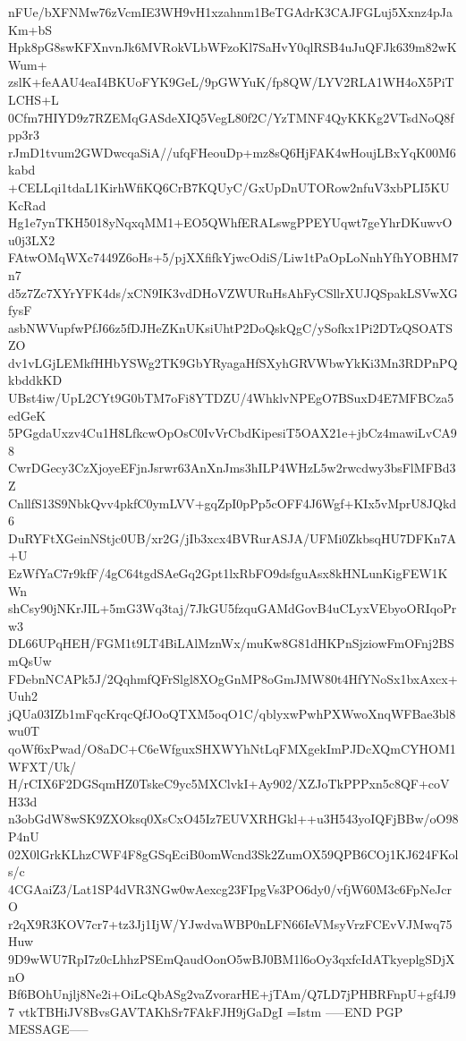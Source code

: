 nFUe/bXFNMw76zVcmIE3WH9vH1xzahnm1BeTGAdrK3CAJFGLuj5Xxnz4pJaKm+bS
Hpk8pG8swKFXnvnJk6MVRokVLbWFzoKl7SaHvY0qlRSB4uJuQFJk639m82wKWum+
zslK+feAAU4eaI4BKUoFYK9GeL/9pGWYuK/fp8QW/LYV2RLA1WH4oX5PiTLCHS+L
0Cfm7HIYD9z7RZEMqGASdeXIQ5VegL80f2C/YzTMNF4QyKKKg2VTsdNoQ8fpp3r3
rJmD1tvum2GWDwcqaSiA//ufqFHeouDp+mz8sQ6HjFAK4wHoujLBxYqK00M6kabd
+CELLqi1tdaL1KirhWfiKQ6CrB7KQUyC/GxUpDnUTORow2nfuV3xbPLI5KUKcRad
Hg1e7ynTKH5018yNqxqMM1+EO5QWhfERALswgPPEYUqwt7geYhrDKuwvOu0j3LX2
FAtwOMqWXc7449Z6oHs+5/pjXXfifkYjwcOdiS/Liw1tPaOpLoNnhYfhYOBHM7n7
d5z7Zc7XYrYFK4ds/xCN9IK3vdDHoVZWURuHsAhFyCSllrXUJQSpakLSVwXGfysF
asbNWVupfwPfJ66z5fDJHeZKnUKsiUhtP2DoQskQgC/ySofkx1Pi2DTzQSOATSZO
dv1vLGjLEMkfHHbYSWg2TK9GbYRyagaHfSXyhGRVWbwYkKi3Mn3RDPnPQkbddkKD
UBst4iw/UpL2CYt9G0bTM7oFi8YTDZU/4WhklvNPEgO7BSuxD4E7MFBCza5edGeK
5PGgdaUxzv4Cu1H8LfkcwOpOsC0IvVrCbdKipesiT5OAX21e+jbCz4mawiLvCA98
CwrDGecy3CzXjoyeEFjnJsrwr63AnXnJms3hILP4WHzL5w2rwcdwy3bsFlMFBd3Z
CnllfS13S9NbkQvv4pkfC0ymLVV+gqZpI0pPp5cOFF4J6Wgf+KIx5vMprU8JQkd6
DuRYFtXGeinNStjc0UB/xr2G/jIb3xcx4BVRurASJA/UFMi0ZkbsqHU7DFKn7A+U
EzWfYaC7r9kfF/4gC64tgdSAeGq2Gpt1lxRbFO9dsfguAsx8kHNLunKigFEW1KWn
shCsy90jNKrJIL+5mG3Wq3taj/7JkGU5fzquGAMdGovB4uCLyxVEbyoORIqoPrw3
DL66UPqHEH/FGM1t9LT4BiLAlMznWx/muKw8G81dHKPnSjziowFmOFnj2BSmQsUw
FDebnNCAPk5J/2QqhmfQFrSlgl8XOgGnMP8oGmJMW80t4HfYNoSx1bxAxcx+Uuh2
jQUa03IZb1mFqcKrqcQfJOoQTXM5oqO1C/qblyxwPwhPXWwoXnqWFBae3bl8wu0T
qoWf6xPwad/O8aDC+C6eWfguxSHXWYhNtLqFMXgekImPJDcXQmCYHOM1WFXT/Uk/
H/rCIX6F2DGSqmHZ0TskeC9yc5MXClvkI+Ay902/XZJoTkPPPxn5c8QF+coVH33d
n3obGdW8wSK9ZXOksq0XsCxO45Iz7EUVXRHGkl++u3H543yoIQFjBBw/oO98P4nU
02X0lGrkKLhzCWF4F8gGSqEciB0omWcnd3Sk2ZumOX59QPB6COj1KJ624FKols/c
4CGAaiZ3/Lat1SP4dVR3NGw0wAexcg23FIpgVs3PO6dy0/vfjW60M3c6FpNeJcrO
r2qX9R3KOV7cr7+tz3Jj1IjW/YJwdvaWBP0nLFN66IeVMsyVrzFCEvVJMwq75Huw
9D9wWU7RpI7z0cLhhzPSEmQaudOonO5wBJ0BM1l6oOy3qxfcIdATkyeplgSDjXnO
Bf6BOhUnjlj8Ne2i+OiLcQbASg2vaZvorarHE+jTAm/Q7LD7jPHBRFnpU+gf4J97
vtkTBHiJV8BvsGAVTAKhSr7FAkFJH9jGaDgI
=Istm
-----END PGP MESSAGE-----
